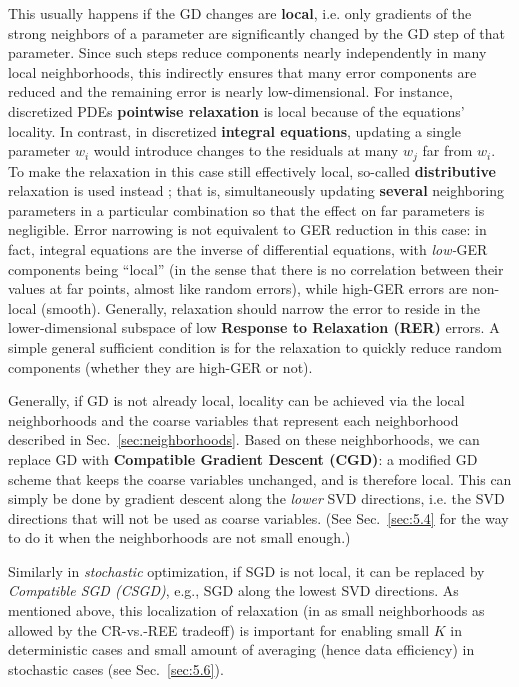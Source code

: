\documentclass{article} %
\begin{document}
This usually happens if the GD changes are \textbf{local}, i.e. only gradients of the strong neighbors of a parameter are significantly changed by the GD step of that parameter. Since such steps reduce components nearly independently in many local neighborhoods, this indirectly ensures that many error components are reduced and the remaining error is nearly low-dimensional. For instance, discretized PDEs \textbf{pointwise relaxation} \cite[Sec.~1]{guide} is local because of the equations' locality. In contrast, in discretized \textbf{integral equations}, updating a single parameter $w_i$ would introduce changes to the residuals at many $w_j$ far from $w_i$. To make the relaxation in this case still effectively local, so-called \textbf{distributive} relaxation is used instead \cite{lubrecht}; that is, simultaneously updating \textbf{several} neighboring parameters in a particular combination so that the effect on far parameters is negligible. Error narrowing is not equivalent to GER reduction in this case: in fact, integral equations are the inverse of differential equations, with {\it low-}GER components being ``local'' (in the sense that there is no correlation between their values at far points, almost like random errors), while high-GER errors are non-local (smooth). Generally, relaxation should narrow the error to reside in the lower-dimensional subspace of low \textbf{Response to Relaxation (RER)} errors. A simple general sufficient condition is for the relaxation to quickly reduce random components (whether they are high-GER or not).

Generally, if GD is not already local, locality can be achieved via the local neighborhoods and the coarse variables that represent each neighborhood described in Sec.~\ref{sec:neighborhoods}. Based on these neighborhoods, we can replace GD with \textbf{Compatible Gradient Descent (CGD)}: a modified GD scheme that keeps the coarse variables unchanged, and is therefore local. This can simply be done by gradient descent along the {\it lower} SVD directions, i.e. the SVD directions that will not be used as coarse variables. (See Sec.~\ref{sec:5.4} for the way to do it when the neighborhoods are not small enough.)

Similarly in {\it stochastic} optimization, if SGD is not local, it can be replaced by {\it Compatible SGD (CSGD)}, e.g., SGD along the lowest SVD directions. As mentioned above, this localization of relaxation (in as small neighborhoods as allowed by the CR-vs.-REE tradeoff) is important for enabling small $K$ in deterministic cases and small amount of averaging (hence data efficiency) in stochastic cases (see Sec.~\ref{sec:5.6}).
\end{document}
